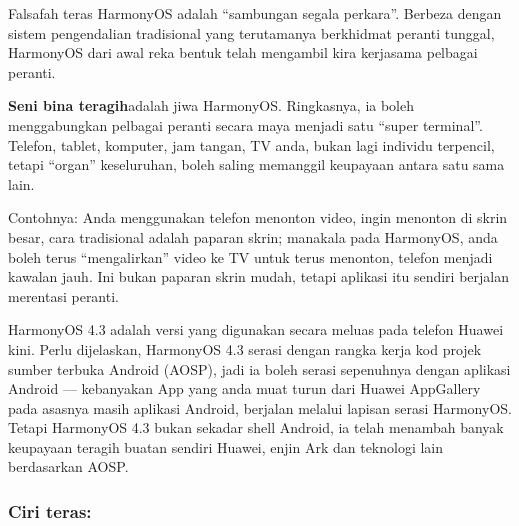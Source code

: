 


Falsafah teras HarmonyOS adalah “sambungan segala perkara”. Berbeza dengan sistem pengendalian tradisional yang terutamanya berkhidmat peranti tunggal, HarmonyOS dari awal reka bentuk telah mengambil kira kerjasama pelbagai peranti.

\textbf{Seni bina teragih}adalah jiwa HarmonyOS. Ringkasnya, ia boleh menggabungkan pelbagai peranti secara maya menjadi satu “super terminal”. Telefon, tablet, komputer, jam tangan, TV anda, bukan lagi individu terpencil, tetapi “organ” keseluruhan, boleh saling memanggil keupayaan antara satu sama lain.

Contohnya: Anda menggunakan telefon menonton video, ingin menonton di skrin besar, cara tradisional adalah paparan skrin; manakala pada HarmonyOS, anda boleh terus “mengalirkan” video ke TV untuk terus menonton, telefon menjadi kawalan jauh. Ini bukan paparan skrin mudah, tetapi aplikasi itu sendiri berjalan merentasi peranti.


HarmonyOS 4.3 adalah versi yang digunakan secara meluas pada telefon Huawei kini. Perlu dijelaskan, HarmonyOS 4.3 serasi dengan rangka kerja kod projek sumber terbuka Android (AOSP), jadi ia boleh serasi sepenuhnya dengan aplikasi Android — kebanyakan App yang anda muat turun dari Huawei AppGallery pada asasnya masih aplikasi Android, berjalan melalui lapisan serasi HarmonyOS. Tetapi HarmonyOS 4.3 bukan sekadar shell Android, ia telah menambah banyak keupayaan teragih buatan sendiri Huawei, enjin Ark dan teknologi lain berdasarkan AOSP.

\subsubsection*{Ciri teras:}

